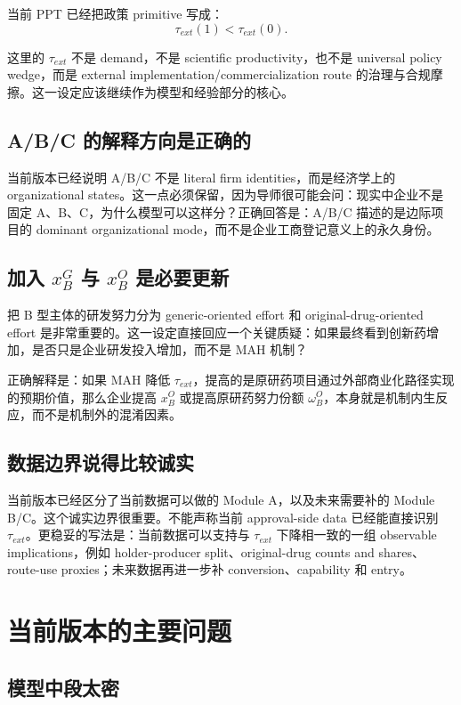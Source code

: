 \documentclass[12pt]{ctexart}
\begin{document}
当前 PPT 已经把政策 primitive 写成：
\[
\tau_{ext}(1)<\tau_{ext}(0).
\]

这里的 $\tau_{ext}$ 不是 demand，不是 scientific productivity，也不是 universal policy wedge，而是 external implementation/commercialization route 的治理与合规摩擦。这一设定应该继续作为模型和经验部分的核心。

\subsection{A/B/C 的解释方向是正确的}

当前版本已经说明 A/B/C 不是 literal firm identities，而是经济学上的 organizational states。这一点必须保留，因为导师很可能会问：现实中企业不是固定 A、B、C，为什么模型可以这样分？正确回答是：A/B/C 描述的是边际项目的 dominant organizational mode，而不是企业工商登记意义上的永久身份。

\subsection{加入 $x_B^G$ 与 $x_B^O$ 是必要更新}

把 B 型主体的研发努力分为 generic-oriented effort 和 original-drug-oriented effort 是非常重要的。这一设定直接回应一个关键质疑：如果最终看到创新药增加，是否只是企业研发投入增加，而不是 MAH 机制？

正确解释是：如果 MAH 降低 $\tau_{ext}$，提高的是原研药项目通过外部商业化路径实现的预期价值，那么企业提高 $x_B^O$ 或提高原研药努力份额 $\omega_B^O$，本身就是机制内生反应，而不是机制外的混淆因素。

\subsection{数据边界说得比较诚实}

当前版本已经区分了当前数据可以做的 Module A，以及未来需要补的 Module B/C。这个诚实边界很重要。不能声称当前 approval-side data 已经能直接识别 $\tau_{ext}$。更稳妥的写法是：当前数据可以支持与 $\tau_{ext}$ 下降相一致的一组 observable implications，例如 holder-producer split、original-drug counts and shares、route-use proxies；未来数据再进一步补 conversion、capability 和 entry。

\section{当前版本的主要问题}

\subsection{模型中段太密}
\end{document}
